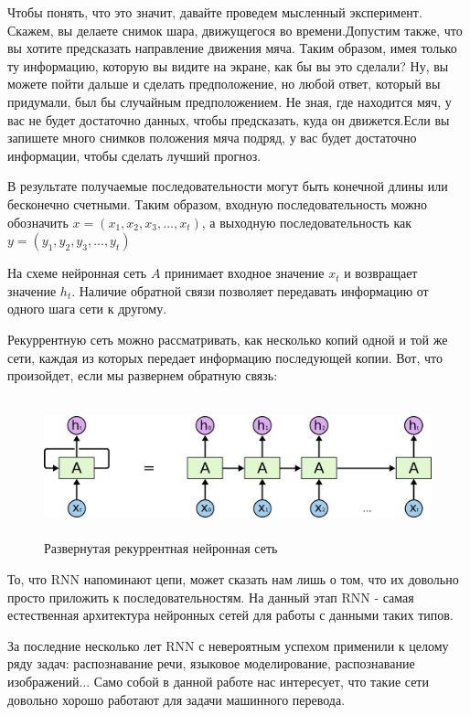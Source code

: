 	Чтобы понять, что это значит, давайте проведем мысленный эксперимент. Скажем, вы делаете снимок шара, движущегося во времени.Допустим также, что вы хотите предсказать направление движения мяча. Таким образом, имея только ту информацию, которую вы видите на экране, как бы вы это сделали? Ну, вы можете пойти дальше и сделать предположение, но любой ответ, который вы придумали, был бы случайным предположением. Не зная, где находится мяч, у вас не будет достаточно данных, чтобы предсказать, куда он движется.Если вы запишете много снимков положения мяча подряд, у вас будет достаточно информации, чтобы сделать лучший прогноз.
	
	В результате получаемые последовательности могут быть конечной длины или бесконечно счетными. Таким образом, входную последовательность можно обозначить $x = (x_1, x_2, x_3, ... , x_t)$, а выходную последовательность как $y = (y_1, y_2, y_3, ... , y_t)$
	
	На схеме нейронная сеть $A$ принимает входное значение $x_t$ и возвращает значение $h_t$. Наличие обратной связи позволяет передавать информацию от одного шага сети к другому.
	
	Рекуррентную сеть можно рассматривать, как несколько копий одной и той же сети, каждая из которых передает информацию последующей копии. Вот, что произойдет, если мы развернем обратную связь:
	
	\begin{figure}[ht!]
		\centering
		\captionsetup{justification=centering}
		\includegraphics[height=40mm]{img/3.png}
		\caption{Развернутая рекуррентная нейронная сеть}
	\end{figure}
	
	То, что RNN напоминают цепи, может сказать нам лишь о том, что их довольно просто приложить к последовательностям. На данный этап RNN - самая естественная архитектура нейронных сетей для работы с данными таких типов.
	
	За последние несколько лет RNN с невероятным успехом применили к целому ряду задач: распознавание речи, языковое моделирование, распознавание изображений... Само собой в данной работе нас интересует, что такие сети довольно хорошо работают для задачи машинного перевода.
	
